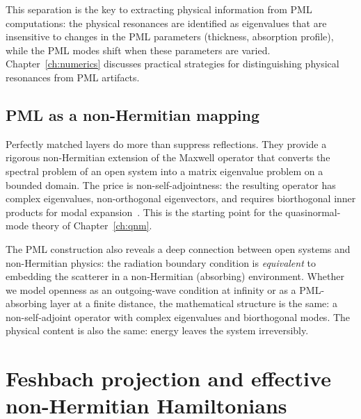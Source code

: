 This separation is the key to extracting physical information from PML
computations: the physical resonances are identified as eigenvalues that
are insensitive to changes in the PML parameters (thickness, absorption
profile), while the PML modes shift when these parameters are varied.
Chapter~\ref{ch:numerics} discusses practical strategies for
distinguishing physical resonances from PML artifacts.

\subsection{PML as a non-Hermitian mapping}
\label{ssec:pml-nh}

\begin{takeaway}
Perfectly matched layers do more than suppress reflections. They
provide a rigorous non-Hermitian extension of the Maxwell operator that
converts the spectral problem of an open system into a matrix eigenvalue
problem on a bounded domain. The price is non-self-adjointness: the
resulting operator has complex eigenvalues, non-orthogonal eigenvectors,
and requires biorthogonal inner products for modal
expansion~\cite{kristensen2011effective}. This is the starting point
for the quasinormal-mode theory of Chapter~\ref{ch:qnm}.
\end{takeaway}

The PML construction also reveals a deep connection between open
systems and non-Hermitian physics: the radiation boundary condition is
\emph{equivalent} to embedding the scatterer in a non-Hermitian
(absorbing) environment. Whether we model openness as an outgoing-wave
condition at infinity or as a PML-absorbing layer at a finite distance,
the mathematical structure is the same: a non-self-adjoint operator with
complex eigenvalues and biorthogonal modes. The physical content is also
the same: energy leaves the system irreversibly.


\section{Feshbach projection and effective non-Hermitian Hamiltonians}
\label{sec:feshbach}

